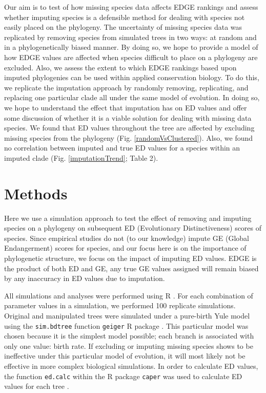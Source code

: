 \documentclass[12pt,english]{article}
\begin{document}
Our aim is to test of how missing species data affects EDGE rankings and assess
whether imputing species is a defensible method for dealing with species not
easily placed on the phylogeny. The uncertainty of missing species data was
replicated by removing species from simulated trees in two ways: at random and
in a phylogenetically biased manner. By doing so, we hope to provide a model of
how EDGE values are affected when species difficult to place on a phylogeny are
excluded. Also, we assess the extent to which EDGE rankings based upon imputed
phylogenies can be used within applied conservation biology. To do this, we
replicate the imputation approach by randomly removing, replicating, and
replacing one particular clade all under the same model of evolution. In doing
so, we hope to understand the effect that imputation has on ED values and offer
some discussion of whether it is a viable solution for dealing with missing data
species. We found that ED values throughout the tree are affected by excluding
missing species from the phylogeny (Fig. \ref{randomVsClustered}). Also, we found no
correlation between imputed and true ED values for a species within an imputed
clade (Fig. \ref{imputationTrend}; Table 2). 

\section*{Methods}
Here we use a simulation approach to test the effect of removing and imputing
species on a phylogeny on subsequent ED (Evolutionary Distinctiveness) scores of
species. Since empirical studies do not (to our knowledge) impute GE (Global
Endangerment) scores for species, and our focus here is on the importance of
phylogenetic structure, we focus on the impact of imputing ED values. EDGE is
the product of both ED and GE, any true GE values assigned will remain biased by
any inaccuracy in ED values due to imputation.

All simulations and analyses were performed using R \autocite[version
3.4.0;][]{R2017}. For each combination of parameter values in a simulation, we
performed 100 replicate simulations. Original and manipulated trees were
simulated under a pure-birth Yule model using the \texttt{sim.bdtree} function
\texttt{geiger} R package \autocite{Harmon2007}. This particular model was
chosen because it is the simplest model possible; each branch is associated with
only one value: birth rate. If excluding or imputing missing species shows to be
ineffective under this particular model of evolution, it will most likely not be
effective in more complex biological simulations. In order to calculate ED
values, the function \texttt{ed.calc} within the R package \texttt{caper} was
used to calculate ED values for each tree \autocite{Orme2013}.
\end{document}
